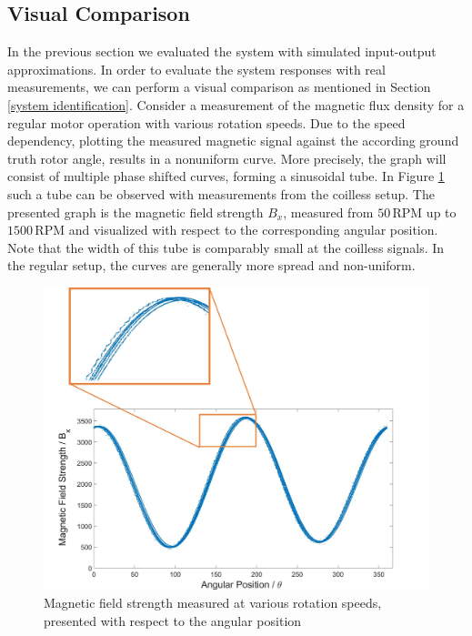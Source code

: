\documentclass[english]{isasthesis}
\begin{document}
  		\subsection{Visual Comparison}
  		In the previous section we evaluated the system with simulated input-output approximations. In order to evaluate the system responses with real measurements, we can perform a visual comparison as mentioned in Section \ref{system identification}. Consider a measurement of the magnetic flux density for a regular motor operation with various rotation speeds. Due to the speed dependency, plotting the measured magnetic signal against the according ground truth rotor angle, results in a nonuniform curve. More precisely, the graph will consist of multiple phase shifted curves, forming a sinusoidal tube. In Figure \ref{fig:tube} such a tube can be observed with measurements from the coilless setup. The presented graph is the magnetic field strength $B_x$, measured from $50\,$RPM up to $1500\,$RPM and visualized with respect to the corresponding angular position. Note that the width of this tube is comparably small at the coilless signals. In the regular setup, the curves are generally more spread and non-uniform. 
  		\begin{figure}[p]
    		\begin{center}
    			\includegraphics[width=1\textwidth]{figures/curve_tube.jpg}   
  			\end{center}
    		\caption{Magnetic field strength measured at various rotation speeds, presented with respect to the angular position}
    		\label{fig:tube}
    		\end{figure} 
\end{document}
